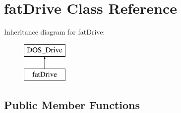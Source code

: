 \hypertarget{classfatDrive}{\section{fat\-Drive Class Reference}
\label{classfatDrive}
}
Inheritance diagram for fat\-Drive\-:\begin{figure}[H]
\begin{center}
\leavevmode
\includegraphics[height=2.000000cm]{classfatDrive}
\end{center}
\end{figure}
\subsection*{Public Member Functions}
